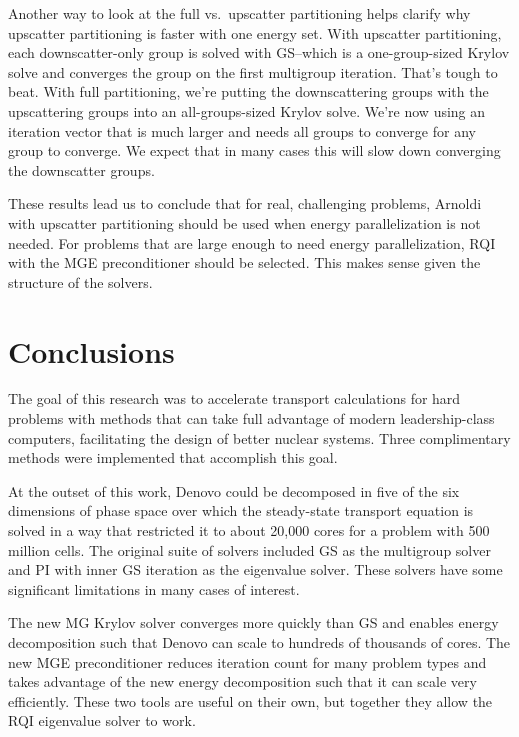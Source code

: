 \documentclass{article}                                                                           %
\begin{document}
Another way to look at the full vs.\ upscatter partitioning helps clarify why upscatter partitioning is faster with one energy set. With upscatter partitioning, each downscatter-only group is solved with GS--which is a one-group-sized Krylov solve and converges the group on the first multigroup iteration. That's tough to beat. With full partitioning, we're putting the downscattering groups with the upscattering groups into an all-groups-sized Krylov solve. We're now using an iteration vector that is much larger and needs all groups to converge for any group to converge. We expect that in many cases this will slow down converging the downscatter groups. 

These results lead us to conclude that for real, challenging problems, Arnoldi with upscatter partitioning should be used when energy parallelization is not needed. For problems that are large enough to need energy parallelization, RQI with the MGE preconditioner should be selected. This makes sense given the structure of the solvers.


\section{Conclusions}
\label{sec:conclusions}
The goal of this research was to accelerate transport calculations for hard problems with methods that can take full advantage of modern leadership-class computers, facilitating the design of better nuclear systems. Three complimentary methods were implemented that accomplish this goal. 

At the outset of this work, Denovo could be decomposed in five of the six dimensions of phase space over which the steady-state transport equation is solved in a way that restricted it to about 20,000 cores for a problem with 500 million cells. The original suite of solvers included GS as the multigroup solver and PI with inner GS iteration as the eigenvalue solver. These solvers have some significant limitations in many cases of interest. 

The new MG Krylov solver converges more quickly than GS and enables energy decomposition such that Denovo can scale to hundreds of thousands of cores. The new MGE preconditioner reduces iteration count for many problem types and takes advantage of the new energy decomposition such that it can scale very efficiently. These two tools are useful on their own, but together they allow the RQI eigenvalue solver to work.
\end{document}
